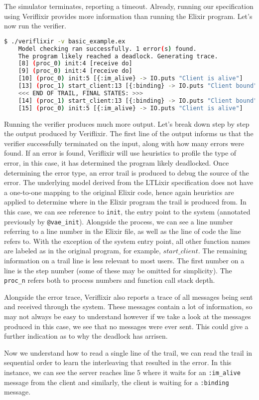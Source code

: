 The simulator terminates, reporting a timeout. Already, running our specification using Veriflixir provides more information than running the Elixir program. Let's now run the verifier.
\begin{lstlisting}[language=bash, xleftmargin=.2\linewidth]
    $ ./veriflixir -v basic_example.ex
    Model checking ran successfully. 1 error(s) found.
    The program likely reached a deadlock. Generating trace.
    [8] (proc_0) init:4 [receive do]
    [9] (proc_0) init:4 [receive do]
    [10] (proc_0) init:5 [{:im_alive} -> IO.puts "Client is alive"]
    [13] (proc_1) start_client:13 [{:binding} -> IO.puts "Client bound"]
    <<< END OF TRAIL, FINAL STATES: >>>
    [14] (proc_1) start_client:13 [{:binding} -> IO.puts "Client bound"]
    [15] (proc_0) init:5 [{:im_alive} -> IO.puts "Client is alive"]
\end{lstlisting}
Running the verifier produces much more output. Let's break down step by step the output produced by Veriflixir. The first line of the output informs us that the verifier successfully terminated on the input, along with how many errors were found. If an error is found, Veriflixir will use heuristics to profile the type of error, in this case, it has determined the program likely deadlocked. Once determining the error type, an error trail is produced to debug the source of the error. The underlying model derived from the LTLixir specification does not have a one-to-one mapping to the original Elixir code, hence again heuristics are applied to determine where in the Elixir program the trail is produced from. In this case, we can see reference to \texttt{init}, the entry point to the system (annotated previously by \texttt{@vae\_init}). Alongside the process, we can see a line number referring to a line number in the Elixir file, as well as the line of code the line refers to. With the exception of the system entry point, all other function names are labeled as in the original program, for example, $start\_client$. The remaining information on a trail line is less relevant to most users. The first number on a line is the step number (some of these may be omitted for simplicity). The \texttt{proc\_n} refers both to process numbers and function call stack depth.
\par
Alongside the error trace, Veriflixir also reports a trace of all messages being sent and received through the system. These messages contain a lot of information, so may not always be easy to understand however if we take a look at the messages produced in this case, we see that no messages were ever sent. This could give a further indication as to why the deadlock has arrisen.
\par
Now we understand how to read a single line of the trail, we can read the trail in sequential order to learn the interleaving that resulted in the error. In this instance, we can see the server reaches line 5 where it waits for an \texttt{:im\_alive} message from the client and similarly, the client is waiting for a \texttt{:binding} message.
